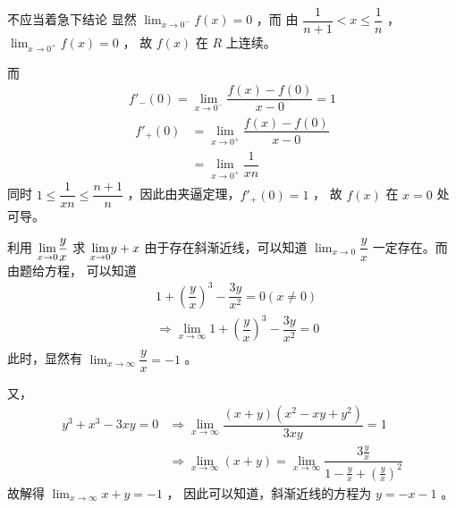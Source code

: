 \begin{answer}[C2T8]{不应当着急下结论}
    显然 $ {\displaystyle\lim_{x\rightarrow 0^-}}f(x) = 0 $ ，而
    由 $ \dfrac{1}{n+1} < x \leq \dfrac{1}{n} $ ， $ {\displaystyle\lim_{x\rightarrow 0^+}}f(x)=0 $ ，
    故 $ f(x) $ 在 $ R $ 上连续。
    
    而\begin{equation*}
        \begin{aligned}
            f'_-(0) = {\displaystyle\lim_{x\rightarrow 0^-}}\dfrac{f(x)-f(0)}{x-0} = 1
        \end{aligned}
    \end{equation*}
    \begin{equation*}
        \begin{aligned}
            f'_+(0) &= {\displaystyle\lim_{x\rightarrow 0^+}}
            \dfrac{f(x)-f(0)}{x - 0} \\&= {\displaystyle\lim_{x\rightarrow 0^+}}
            \dfrac{1}{xn}
        \end{aligned}
    \end{equation*}
    同时 $ 1\leq \dfrac{1}{xn} \leq \dfrac{n+1}{n} $ ，因此由夹逼定理，$ f'_+(0) = 1 $ ，
    故 $ f(x) $ 在 $ x=0 $ 处可导。
\end{answer}

\begin{answer}[C2T11]{利用 $ {\displaystyle\lim_{x\rightarrow 0}}\dfrac{y}{x} $ 求 $ {\displaystyle\lim_{x\rightarrow 0}}y+x $ }
    由于存在斜渐近线，可以知道 $ {\displaystyle\lim_{x\rightarrow 0}}\dfrac{y}{x} $ 一定存在。而由题给方程，
    可以知道\begin{equation*}
        \begin{aligned}
            &1+(\dfrac{y}{x})^3 - \dfrac{3y}{x^2} = 0 (x\neq 0)\\ &\Rightarrow
            {\displaystyle\lim_{x\rightarrow \infty}}1+(\dfrac{y}{x})^3 - \dfrac{3y}{x^2} = 0 \\
        \end{aligned}
    \end{equation*}
    此时，显然有 $ {\displaystyle\lim_{x\rightarrow \infty}}\dfrac{y}{x} = -1 $ 。

    又，\begin{equation*}
        \begin{aligned}
            y^3+x^3-3xy = 0&\Rightarrow {\displaystyle\lim_{x\rightarrow \infty}}
            \dfrac{(x+y)(x^2 - xy + y^2)}{3xy} = 1 \\ &\Rightarrow
            {\displaystyle\lim_{x\rightarrow \infty}}(x+y) = 
            {\displaystyle\lim_{x\rightarrow \infty}}\dfrac{3\frac{y}{x}}{1 - \frac{y}{x} + (\frac{y}{x})^2}            
        \end{aligned}
    \end{equation*}
    故解得 $ {\displaystyle\lim_{x\rightarrow \infty}}x+y = -1 $ ，
    因此可以知道，斜渐近线的方程为 $ y = -x-1 $ 。
\end{answer}

